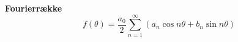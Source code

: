 \documentclass[12pt,a4paper,draft]{report}
\author{Frederik Appel Vardinghus-Nielsen}
\begin{document}
\textbf{Fourierrække}
\begin{equation}
f(\theta)=\frac{a_0}{2}\sum_{n=1}^{\infty}(a_n \cos n\theta+b_n \sin n\theta )
\end{equation}
\end{document}
